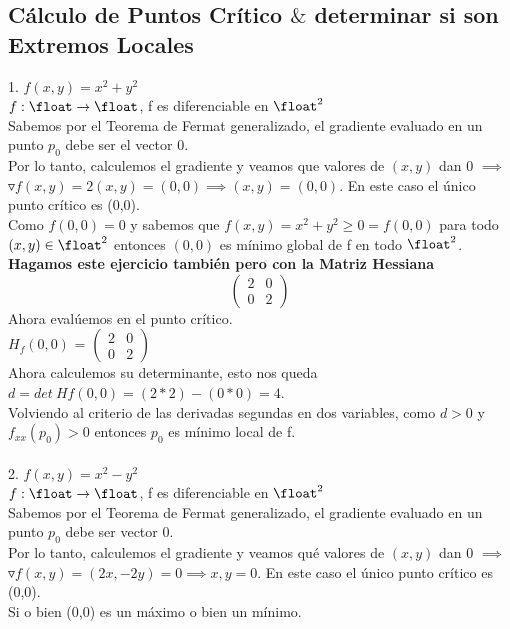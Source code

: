 \documentclass[10pt,a4paper]{article}
\begin{document}
\subsection*{Cálculo de Puntos Crítico $\&$ determinar si son Extremos Locales}
\label{subsec:calculo_puntos_criticos}
1. $f(x,y) = x^{2} + y^{2}$ \\
$f:\float \rightarrow \float$, f es diferenciable en $\float^2$ \\
Sabemos por el Teorema de Fermat generalizado, el gradiente evaluado en un punto $p_{0}$ debe ser el vector 0. \\
Por lo tanto, calculemos el gradiente y veamos que valores de $(x,y)$ dan 0 $\implies$ $\triangledown f (x,y) = 2(x,y) = (0,0) \implies (x,y) = (0,0)$. En este caso el único punto crítico es (0,0). \\
Como $f(0,0) = 0$ y sabemos que $f(x,y) = x^{2} + y^{2} \ge 0 = f(0,0)$ para todo $(x,y) \in \float^{2}$ entonces $(0,0)$ es mínimo global de f en todo $\float^{2}$. \\
\textbf{Hagamos este ejercicio también pero con la Matriz Hessiana} \\
\[
\begin{pmatrix}
2 & 0 \\
0 & 2
\end{pmatrix}
\]
Ahora evalúemos en el punto crítico. \\
$H_{f}(0,0)$ = \(
\begin{pmatrix}
2 & 0 \\
0 & 2
\end{pmatrix}
\) \\
Ahora calculemos su determinante, esto nos queda $d = det \ Hf(0,0) = (2 * 2) - (0 * 0) = 4$. \\
Volviendo al criterio de las derivadas segundas en dos variables, como $d > 0$ y $f_{xx}(p_{0}) > 0$ entonces $p_{0}$ es mínimo local de f. \\ \\
2. $f(x,y) = x^{2} - y^{2}$ \\
$f:\float \rightarrow \float$, f es diferenciable en $\float^2$ \\
Sabemos por el Teorema de Fermat generalizado, el gradiente evaluado en un punto $p_{0}$ debe ser vector 0. \\
Por lo tanto, calculemos el gradiente y veamos qué valores de $(x,y)$ dan 0 $\implies$ $\triangledown f (x,y) = (2x, -2y) = 0 \implies x, y = 0$. En este caso el único punto crítico es (0,0). \\
Si o bien (0,0) es un máximo o bien un mínimo. \\
\end{document}
